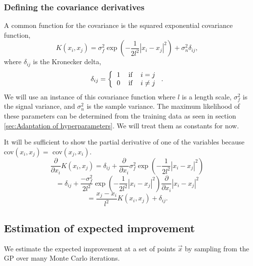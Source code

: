 \subsubsection{Defining the covariance derivatives}
\label{methods_GP_cov}

A common function for the covariance is the squared exponential covariance function,
\begin{equation}
    K(x_{i}, x_{j}) = \sigma_{f}^{2}\exp\left( -\frac{1}{2l^{2}} |x_{i} - x_{j}|^{2}\right)  + \sigma_{n}^{2}\delta_{ij},
\end{equation}
where $\delta_{ij}$ is the Kronecker delta,
\begin{equation}
    \delta_{ij} = \left\{ \begin{tabular}{ccc}
        1 & if & $i=j$ \\
        0 & if & $i\neq j$
    \end{tabular} \right..
\end{equation}
We will use an instance of this covariance function where $l$ is a length scale, $\sigma_{f}^{2}$ is the signal variance, and $\sigma_{n}^{2}$ is the sample variance. The maximum likelihood of these parameters can be determined from the training data as seen in section \ref{sec:Adaptation of hyperparameters}. We will treat them as constants for now.

It will be sufficient to show the partial derivative of one of the variables because cov$(x_{i}, x_{j}) = $ cov$(x_{j}, x_{i})$.
\begin{equation}
    \frac{\partial}{\partial x_{i}} K(x_{i}, x_{j}) = \delta_{ij} + \frac{\partial}{\partial x_{i}} \sigma_{f}^{2} \exp\left( - \frac{1}{2l^{2}} |x_{i} - x_{j}|^{2}\right)
\end{equation}
\begin{equation}
    =  \delta_{ij} + \frac{-\sigma_{f}^{2}}{2l^{2}} \exp\left( - \frac{1}{2l^{2}} |x_{i} - x_{j}|^{2}\right) \frac{\partial}{\partial x_{i}} |x_{i} - x_{j}|^{2}
\end{equation}
\begin{equation}
    =  \frac{x_{j} - x_{i}}{l^{2}} K(x_{i}, x_{j}) + \delta_{ij}.
\end{equation}

\subsection{Estimation of expected improvement}
\label{estEI}

We estimate the expected improvement at a set of points $\vec{x}$ by sampling from the GP over many Monte Carlo iterations.

